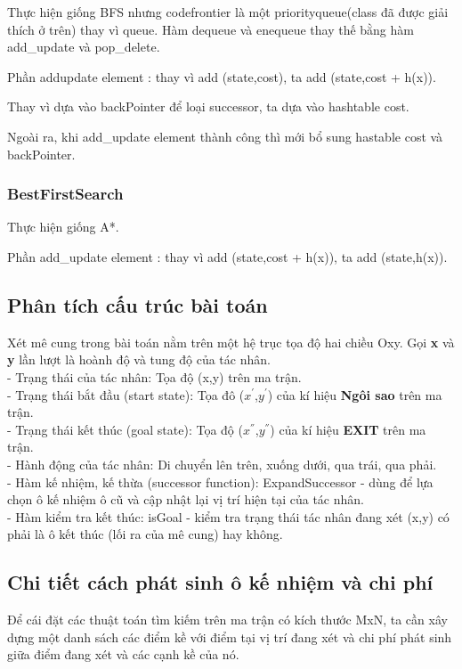\documentclass[11pt]{article} %
\begin{document}
Thực hiện giống BFS nhưng code{frontier} là một priorityqueue(class đã được giải thích ở trên) thay vì queue. Hàm dequeue và enequeue thay thế bằng hàm add\_update và pop\_delete.

Phần addupdate element : thay vì add (state,cost), ta add (state,cost + h(x)).

Thay vì dựa vào backPointer để loại successor, ta dựa vào hashtable cost.

Ngoài ra, khi add\_update element thành công thì mới bổ sung hastable cost và backPointer.



\subsubsection{BestFirstSearch}
Thực hiện giống A*.

Phần add\_update element : thay vì add (state,cost + h(x)), ta add (state,h(x)).
\subsection{Phân tích cấu trúc bài toán}
Xét mê cung trong bài toán nằm trên một hệ trục tọa độ hai chiều Oxy. Gọi \textbf{x} và \textbf{y} lần lượt là hoành độ và tung độ của tác nhân.\\
- Trạng thái của tác nhân: Tọa độ (x,y) trên ma trận.\\
- Trạng thái bắt đầu (start state): Tọa đô ($x^{'}$,$y^{'}$) của kí hiệu \textbf{Ngôi sao} trên ma trận.\\
- Trạng thái kết thúc (goal state): Tọa độ ($x^{''}$,$y^{''}$) của kí hiệu \textbf{EXIT} trên ma trận.\\
- Hành động của tác nhân: Di chuyển lên trên, xuống dưới, qua trái, qua phải.\\
- Hàm kế nhiệm, kế thừa (successor function): ExpandSuccessor - dùng để lựa chọn ô kế nhiệm ô cũ và cập nhật lại vị trí hiện tại của tác nhân.\\
- Hàm kiểm tra kết thúc: isGoal - kiểm tra trạng thái tác nhân đang xét (x,y) có phải là ô kết thúc (lối ra của mê cung) hay không.
\subsection{Chi tiết cách phát sinh ô kế nhiệm và chi phí}
Để cái đặt các thuật toán tìm kiếm trên ma trận có kích thước MxN, ta cần xây dựng một danh sách các điểm kề với điểm tại vị trí đang xét và chi phí phát sinh giữa điểm đang xét và các cạnh kề của nó.\\
\end{document}
